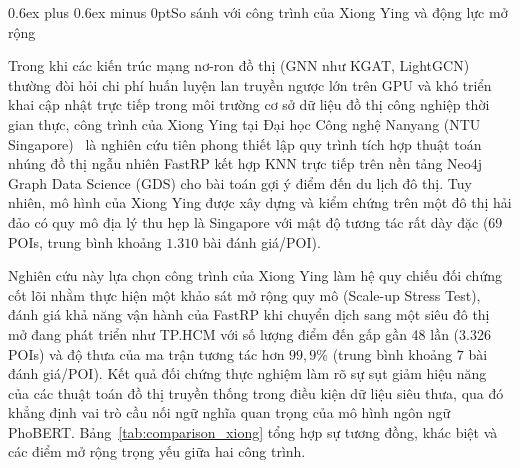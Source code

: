 \documentclass[journal,onecolumn,10pt]{IEEEtran}
\makeatletter
\def\subsection{\@startsection{subsection}{2}{\z@}{1.8ex plus 1.0ex minus 0.3ex}%
{0.6ex plus 0.6ex minus 0pt}{\normalfont\normalsize\bfseries}}
\makeatother
\begin{document}
\subsection{So sánh với công trình của Xiong Ying và động lực mở rộng}

Trong khi các kiến trúc mạng nơ-ron đồ thị (GNN như KGAT, LightGCN) thường đòi hỏi chi phí huấn luyện lan truyền ngược lớn trên GPU và khó triển khai cập nhật trực tiếp trong môi trường cơ sở dữ liệu đồ thị công nghiệp thời gian thực, công trình của Xiong Ying tại Đại học Công nghệ Nanyang (NTU Singapore)~\cite{r18} là nghiên cứu tiên phong thiết lập quy trình tích hợp thuật toán nhúng đồ thị ngẫu nhiên FastRP kết hợp KNN trực tiếp trên nền tảng Neo4j Graph Data Science (GDS) cho bài toán gợi ý điểm đến du lịch đô thị. Tuy nhiên, mô hình của Xiong Ying được xây dựng và kiểm chứng trên một đô thị hải đảo có quy mô địa lý thu hẹp là Singapore với mật độ tương tác rất dày đặc (69 POIs, trung bình khoảng $1.310$ bài đánh giá/POI).

Nghiên cứu này lựa chọn công trình của Xiong Ying làm hệ quy chiếu đối chứng cốt lõi nhằm thực hiện một khảo sát mở rộng quy mô (Scale-up Stress Test), đánh giá khả năng vận hành của FastRP khi chuyển dịch sang một siêu đô thị mở đang phát triển như TP.HCM với số lượng điểm đến gấp gần 48 lần (3.326 POIs) và độ thưa của ma trận tương tác hơn $99{,}9\%$ (trung bình khoảng $7$ bài đánh giá/POI). Kết quả đối chứng thực nghiệm làm rõ sự sụt giảm hiệu năng của các thuật toán đồ thị truyền thống trong điều kiện dữ liệu siêu thưa, qua đó khẳng định vai trò cầu nối ngữ nghĩa quan trọng của mô hình ngôn ngữ PhoBERT. Bảng~\ref{tab:comparison_xiong} tổng hợp sự tương đồng, khác biệt và các điểm mở rộng trọng yếu giữa hai công trình.
\end{document}
